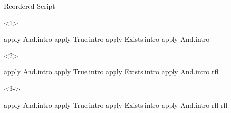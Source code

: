 \begin{frame}[fragile]
\begin{columns}[onlytextwidth,t]
    \begin{column}{.38\textwidth}
      \begin{block}{Reordered Script}
        \begin{onlyenv}<1>
          \begin{leancode}
            apply And.intro
            apply True.intro
            apply Exists.intro
            apply And.intro


          \end{leancode}
        \end{onlyenv}
        \begin{onlyenv}<2>
          \begin{leancode}[highlightlines=5]
            apply And.intro
            apply True.intro
            apply Exists.intro
            apply And.intro
            rfl

          \end{leancode}
        \end{onlyenv}
        \begin{onlyenv}<3->
          \begin{leancode}[highlightlines=6]
            apply And.intro
            apply True.intro
            apply Exists.intro
            apply And.intro
            rfl
            rfl
          \end{leancode}
        \end{onlyenv}
      \end{block}
    \end{column}
  \end{columns}
\end{frame}


